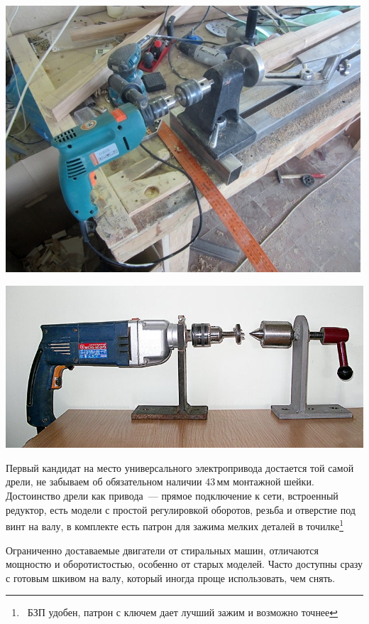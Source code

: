 \documentclass{magazine}
\begin{document}
{\noindent\includegraphics[width=\columnwidth]{fig/00/DrelLathe.jpg}

\noindent\includegraphics[width=\columnwidth]{fig/00/DrelLathe2.jpg}

Первый кандидат на место универсального электропривода достается той
самой дрели, не забываем об обязательном наличии 43\,мм монтажной шейки.
Достоинство дрели как привода\ --- прямое подключение к сети, встроенный
редуктор, есть модели с простой регулировкой оборотов, резьба и отверстие под
винт на валу, в комплекте есть патрон для зажима мелких деталей в
точилке\footnote{\ БЗП удобен, патрон с ключем дает лучший зажим и возможно
точнее}

Ограниченно доставаемые двигатели от стиральных машин, отличаются мощностю и
оборотистостью, особенно от старых моделей. Часто доступны сразу с готовым
шкивом на валу, который иногда проще использовать, чем снять.
  
}
\end{document}
